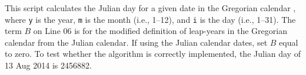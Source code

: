 \noindent This script calculates the Julian day for a given date in the Gregorian calendar \parencite[Ch. 7]{meeus91}, where \texttt{y} is the year, \texttt{m} is the month (i.e., 1--12), and \texttt{i} is the day (i.e., 1--31). 
The term $B$ on Line 06 is for the modified definition of leap-years in the Gregorian calendar from the Julian calendar. If using the Julian calendar dates, set $B$ equal to zero. 
To test whether the algorithm is correctly implemented, the Julian day of 13 Aug 2014 is 2456882.

\newpage

